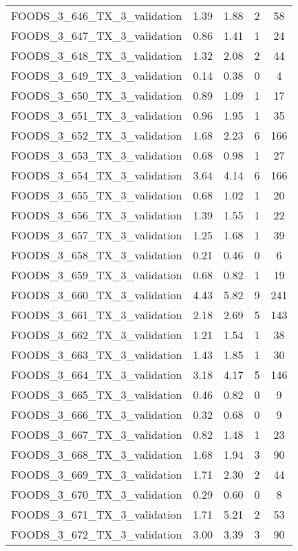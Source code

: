 \begin{table}
\begin{tabular}{|l|c|c|c|c|}
FOODS\_3\_646\_TX\_3\_validation & 1.39 & 1.88 & 2 & 58 \\
FOODS\_3\_647\_TX\_3\_validation & 0.86 & 1.41 & 1 & 24 \\
FOODS\_3\_648\_TX\_3\_validation & 1.32 & 2.08 & 2 & 44 \\
FOODS\_3\_649\_TX\_3\_validation & 0.14 & 0.38 & 0 & 4 \\
FOODS\_3\_650\_TX\_3\_validation & 0.89 & 1.09 & 1 & 17 \\
FOODS\_3\_651\_TX\_3\_validation & 0.96 & 1.95 & 1 & 35 \\
FOODS\_3\_652\_TX\_3\_validation & 1.68 & 2.23 & 6 & 166 \\
FOODS\_3\_653\_TX\_3\_validation & 0.68 & 0.98 & 1 & 27 \\
FOODS\_3\_654\_TX\_3\_validation & 3.64 & 4.14 & 6 & 166 \\
FOODS\_3\_655\_TX\_3\_validation & 0.68 & 1.02 & 1 & 20 \\
FOODS\_3\_656\_TX\_3\_validation & 1.39 & 1.55 & 1 & 22 \\
FOODS\_3\_657\_TX\_3\_validation & 1.25 & 1.68 & 1 & 39 \\
FOODS\_3\_658\_TX\_3\_validation & 0.21 & 0.46 & 0 & 6 \\
FOODS\_3\_659\_TX\_3\_validation & 0.68 & 0.82 & 1 & 19 \\
FOODS\_3\_660\_TX\_3\_validation & 4.43 & 5.82 & 9 & 241 \\
FOODS\_3\_661\_TX\_3\_validation & 2.18 & 2.69 & 5 & 143 \\
FOODS\_3\_662\_TX\_3\_validation & 1.21 & 1.54 & 1 & 38 \\
FOODS\_3\_663\_TX\_3\_validation & 1.43 & 1.85 & 1 & 30 \\
FOODS\_3\_664\_TX\_3\_validation & 3.18 & 4.17 & 5 & 146 \\
FOODS\_3\_665\_TX\_3\_validation & 0.46 & 0.82 & 0 & 9 \\
FOODS\_3\_666\_TX\_3\_validation & 0.32 & 0.68 & 0 & 9 \\
FOODS\_3\_667\_TX\_3\_validation & 0.82 & 1.48 & 1 & 23 \\
FOODS\_3\_668\_TX\_3\_validation & 1.68 & 1.94 & 3 & 90 \\
FOODS\_3\_669\_TX\_3\_validation & 1.71 & 2.30 & 2 & 44 \\
FOODS\_3\_670\_TX\_3\_validation & 0.29 & 0.60 & 0 & 8 \\
FOODS\_3\_671\_TX\_3\_validation & 1.71 & 5.21 & 2 & 53 \\
FOODS\_3\_672\_TX\_3\_validation & 3.00 & 3.39 & 3 & 90 \\

\end{tabular}
\end{table}
